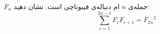 \EXERCISE
$F_n$
جمله‌ی
$n$
ام دنباله‌ی فیبوناچی است. نشان دهید:
$$\sum_{r=1}^{2n-1} F_rF_{r+1} = {F_{2n}}^2$$